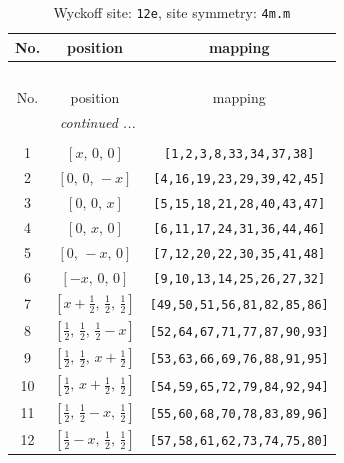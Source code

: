 \documentclass[fleqn,8pt]{jsarticle}
\begin{document}
\begin{longtable}{ccc}
\caption{Wyckoff site: {\tt 12e}, site symmetry: {\tt 4m.m}}
 \\
 \hline \hline
No. & position & mapping \\ \hline \endfirsthead

\multicolumn{2}{l}{\tablename\ \thetable{}} \\
 \hline \hline
No. & position & mapping \\ \hline \endhead

 \hline \hline
\multicolumn{2}{r}{\footnotesize\it continued ...} \\ \endfoot

 \hline \hline
\multicolumn{2}{r}{} \\ \endlastfoot

1 & $\left[ x,\, 0,\, 0 \right]$ & {\tt [1,2,3,8,33,34,37,38]} \\ \hline
2 & $\left[ 0,\, 0,\, - x \right]$ & {\tt [4,16,19,23,29,39,42,45]} \\ \hline
3 & $\left[ 0,\, 0,\, x \right]$ & {\tt [5,15,18,21,28,40,43,47]} \\ \hline
4 & $\left[ 0,\, x,\, 0 \right]$ & {\tt [6,11,17,24,31,36,44,46]} \\ \hline
5 & $\left[ 0,\, - x,\, 0 \right]$ & {\tt [7,12,20,22,30,35,41,48]} \\ \hline
6 & $\left[ - x,\, 0,\, 0 \right]$ & {\tt [9,10,13,14,25,26,27,32]} \\ \hline
7 & $\left[ x + \frac{1}{2},\, \frac{1}{2},\, \frac{1}{2} \right]$ & {\tt [49,50,51,56,81,82,85,86]} \\ \hline
8 & $\left[ \frac{1}{2},\, \frac{1}{2},\, \frac{1}{2} - x \right]$ & {\tt [52,64,67,71,77,87,90,93]} \\ \hline
9 & $\left[ \frac{1}{2},\, \frac{1}{2},\, x + \frac{1}{2} \right]$ & {\tt [53,63,66,69,76,88,91,95]} \\ \hline
10 & $\left[ \frac{1}{2},\, x + \frac{1}{2},\, \frac{1}{2} \right]$ & {\tt [54,59,65,72,79,84,92,94]} \\ \hline
11 & $\left[ \frac{1}{2},\, \frac{1}{2} - x,\, \frac{1}{2} \right]$ & {\tt [55,60,68,70,78,83,89,96]} \\ \hline
12 & $\left[ \frac{1}{2} - x,\, \frac{1}{2},\, \frac{1}{2} \right]$ & {\tt [57,58,61,62,73,74,75,80]} \\
\end{longtable}
\renewcommand{\arraystretch}{1.2}
\end{document}
